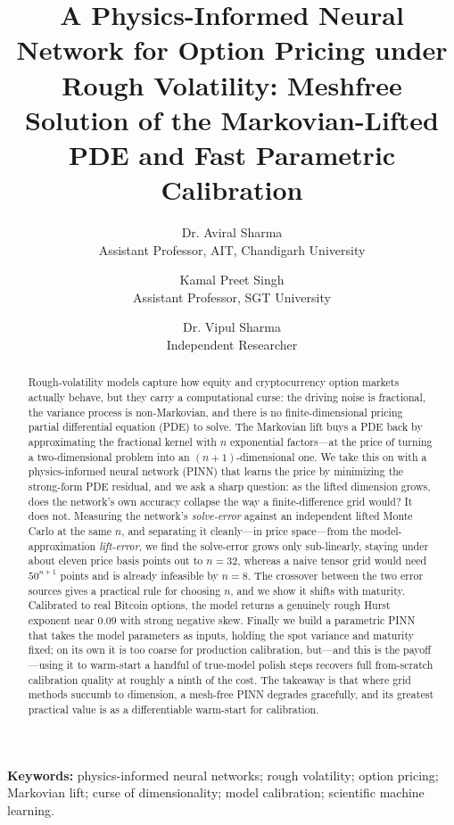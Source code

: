 \documentclass[11pt]{article}
\title{\textbf{A Physics-Informed Neural Network for Option Pricing under Rough
Volatility: Meshfree Solution of the Markovian-Lifted PDE and Fast Parametric
Calibration}}
\author{
Dr. Aviral Sharma\\
Assistant Professor, AIT, Chandigarh University
\and
Kamal Preet Singh\\
Assistant Professor, SGT University
\and
Dr. Vipul Sharma\\
Independent Researcher
}
\begin{document}
\maketitle

\begin{abstract}
Rough-volatility models capture how equity and cryptocurrency option markets
actually behave, but they carry a computational curse: the driving noise is
fractional, the variance process is non-Markovian, and there is no
finite-dimensional pricing partial differential equation (PDE) to solve. The
Markovian lift buys a PDE back by approximating the fractional kernel with $n$
exponential factors---at the price of turning a two-dimensional problem into an
$(n{+}1)$-dimensional one. We take this on with a physics-informed neural network
(PINN) that learns the price by minimizing the strong-form PDE residual, and we
ask a sharp question: as the lifted dimension grows, does the network's own
accuracy collapse the way a finite-difference grid would? It does not. Measuring
the network's \emph{solve-error} against an independent lifted Monte Carlo at the
same $n$, and separating it cleanly---in price space---from the
model-approximation \emph{lift-error}, we find the solve-error grows only
sub-linearly, staying under about eleven price basis points out to $n{=}32$,
whereas a naive tensor grid would need $50^{n+1}$ points and is already infeasible
by $n{=}8$. The crossover between the two error sources gives a practical rule for
choosing $n$, and we show it shifts with maturity. Calibrated to real Bitcoin
options, the model returns a genuinely rough Hurst exponent near $0.09$ with
strong negative skew. Finally we build a parametric PINN that takes the model
parameters as inputs, holding the spot variance and maturity fixed; on its own it
is too coarse for production calibration, but---and this is the payoff---using it
to warm-start a handful of true-model polish steps recovers full from-scratch
calibration quality at roughly a ninth of the cost. The takeaway is that where
grid methods succumb to dimension, a mesh-free PINN degrades gracefully, and its
greatest practical value is as a differentiable warm-start for calibration.
\end{abstract}

\noindent\textbf{Keywords:} physics-informed neural networks; rough volatility;
option pricing; Markovian lift; curse of dimensionality; model calibration;
scientific machine learning.

\end{document}
